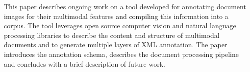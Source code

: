 This paper describes ongoing work on a tool developed for annotating document images for their multimodal features and compiling this information into a corpus. The tool leverages open source computer vision and natural language processing libraries to describe the content and structure of multimodal documents and to generate multiple layers of XML annotation. The paper introduces the annotation schema, describes the document processing pipeline and concludes with a brief description of future work.
